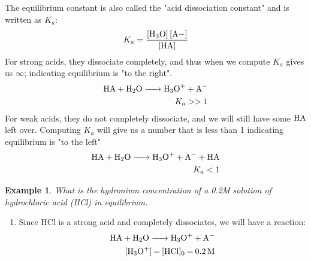 \documentclass{article}  %
\newtheorem{exmp}{Example}
\begin{document}
The equilibrium constant is also called the "acid dissociation constant" and is written as $K_a$:
\begin{equation*}
    \begin{aligned}
        K_a = \ce{\frac{[H3O] [A-]}{[HA]}}
    \end{aligned}
\end{equation*}
For strong acids, they dissociate completely, and thus when we compute $K_a$ gives us $\infty$; indicating equilibrium is "to the right".
\begin{equation*}
    \begin{aligned}
        \ce{HA + H2O -> H3O+ + A-} \\
        K_a >> 1
    \end{aligned}
\end{equation*}
For weak acids, they do not completely dissociate, and we will still have some $\ce{HA}$ left over. Computing $K_a$ will give us a number that is less than 1 indicating equilibrium is "to the left"
\begin{equation*}
    \begin{aligned}
        \ce{HA + H2O -> H3O+ + A- + HA} \\
        K_a < 1
    \end{aligned}
\end{equation*}

\begin{exmp}
    What is the hydronium concentration of a 0.2M solution of hydrochloric acid (HCl) in equilibrium.
\end{exmp}
\begin{enumerate}
    \item Since HCl is a strong acid and completely dissociates, we will have a reaction:
    \begin{equation*}
        \begin{aligned}
            \ce{HA + H2O -> H3O+ + A-} \\
            \ce{[H3O+] = [HCl]_0 = 0.2M}
        \end{aligned}
    \end{equation*}
\end{enumerate}
\end{document}
